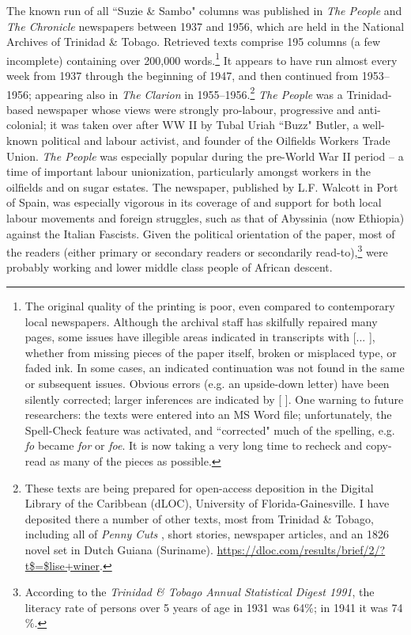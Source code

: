 \documentclass[output=paper,colorlinks,citecolor=brown]{langscibook}
\begin{document}
The known run of all ``Suzie \& Sambo" columns was published in \textit{The People} and \textit{The Chronicle} newspapers between 1937 and 1956, which are held in the National Archives of Trinidad \& Tobago.  Retrieved texts comprise 195 columns (a few incomplete) containing over 200,000 words.\footnote{The original quality of the printing is poor, even compared to contemporary local newspapers. Although the archival staff has skilfully repaired many pages, some issues have illegible areas indicated in transcripts with [... ], whether from missing pieces of the paper itself, broken or misplaced type, or faded ink. In some cases, an indicated continuation was not found in the same or subsequent issues.  Obvious errors (e.g. an upside-down letter) have been silently corrected; larger inferences are indicated by [ ].  One warning to future researchers: the texts were entered into an  MS Word file; unfortunately, the Spell-Check feature was activated, and ``corrected" much of the spelling, e.g. \textit{fo} became \textit{for} or \textit{foe}.  It is now taking a very long time to recheck and copy-read as many of the pieces as possible.} It appears to have run almost every week from 1937 through the beginning of 1947, and then continued from 1953--1956; appearing also in \textit{The Clarion} in 1955--1956.\footnote{These texts are being prepared for open-access deposition in the Digital Library of the Caribbean (dLOC), University of Florida-Gainesville. I have deposited there a number of other texts, most from Trinidad \& Tobago, including all of \textit{Penny Cuts} \citep{winer1995penny}, short stories, newspaper articles, and an 1826 novel set in Dutch Guiana (Suriname). \url{https://dloc.com/results/brief/2/?t$=$lise+winer}.} \textit{The People} was a Trinidad-based newspaper whose views were strongly pro-labour, progressive and anti-colonial; it was taken over after WW II by Tubal Uriah ``Buzz" Butler, a well-known political and labour activist, and founder of the Oilfields Workers Trade Union. \textit{The People} was especially popular during the pre-World War II period – a time of important labour unionization, particularly amongst workers in the oilfields and on sugar estates.  The newspaper, published by L.F. Walcott in Port of Spain, was especially vigorous in its coverage of and support for both local labour movements and foreign struggles, such as that of Abyssinia (now Ethiopia) against the Italian Fascists.  Given the political orientation of the paper, most of the readers (either primary or secondary readers or secondarily read-to),\footnote{According to the \textit{Trinidad \& Tobago Annual Statistical Digest 1991}, the literacy rate of persons over 5 years of age in 1931 was 64$\%$; in 1941 it was 74$\%$.} were probably working and lower middle class people of African descent.
\end{document}
